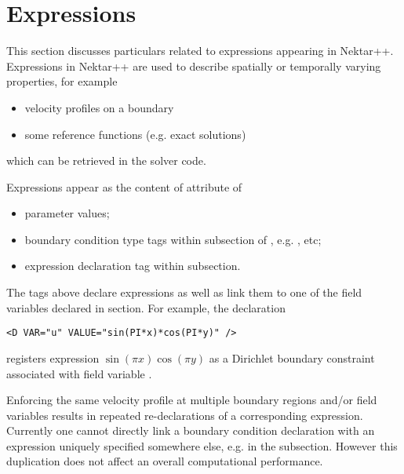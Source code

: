 \section{Expressions}
\label{sec:xml:expressions}

This section discusses particulars related to expressions appearing in
Nektar++. Expressions in Nektar++ are used to describe spatially or
temporally varying properties, for example
\begin{itemize}
\item velocity profiles on a boundary
\item some reference functions (e.g. exact solutions)
\end{itemize}
which can be retrieved in the solver code.

Expressions appear as the content of  attribute of
\begin{itemize}
\item parameter values;
\item boundary condition type tags within  subsection of
 , e.g. ,  etc;
\item expression declaration tag  within 
subsection.
\end{itemize}

The tags above declare expressions as well as link them to one of the
field variables declared in  section. For example, the
declaration 
\begin{lstlisting}[style=XMLStyle]
  <D VAR="u" VALUE="sin(PI*x)*cos(PI*y)" />
\end{lstlisting}
registers expression $\sin(\pi x)\cos(\pi y)$ as a Dirichlet
boundary constraint associated with field variable .

Enforcing the same velocity profile at multiple boundary regions and/or field
variables results in repeated re-declarations of a corresponding
expression. Currently one cannot directly link a boundary condition declaration
with an expression uniquely specified somewhere else, e.g. in the
 subsection. However this duplication does not affect an
overall computational performance.

% 

